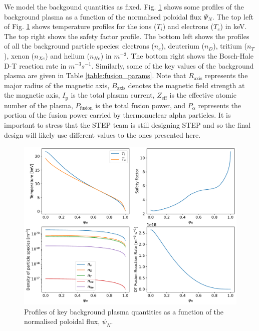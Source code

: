\documentclass[10pt, a4paper, twoside]{article}
\begin{document}
We model the backgound quantities as fixed. Fig. \ref{fig:background_plasma_profiles} shows some profiles of the background plasma as a function of the normalised poloidal flux $\Psi_N$. 
The top left of Fig. \ref{fig:background_plasma_profiles} shows temperature profiles for the ions ($T_i$) and electrons ($T_e$) in keV. 
The top right shows the safety factor profile. 
The bottom left shows the profiles of all the background particle species: electrons ($n_e$), deuterium ($n_D$), tritium ($n_T$), xenon ($n_{Xe}$) and helium ($n_{He}$) in $m^{-3}$. 
The bottom right shows the Bosch-Hale D-T reaction rate \cite{bosch1992} in $m^{-3} s^{-1}$. 
Similarly, some of the key values of the background plasma are given in Table \ref{table:fusion_params}. Note that  $R_{\text{axis}}$ represents the major radius of the magnetic axis, $B_{\text{axis}}$ denotes the magnetic field strength at the magnetic axis, $I_{\text{p}}$ is the total plasma current, $Z_{\text{eff}}$ is the effective atomic number of the plasma, $P_{\text{fusion}}$ is the total fusion power, and $P_{\alpha}$ represents the portion of the fusion power carried by thermonuclear alpha particles. It is important to stress that the STEP team is still designing STEP and so the final design will likely use different values to the ones presented here.

\begin{figure}[!ht]
    \centering
    \includegraphics[width=0.99\linewidth]{Figures/background_plasma_curves.pdf}
    \caption{Profiles of key background plasma quantities as a function of the normalised poloidal flux, $\psi_N$.}
    \label{fig:background_plasma_profiles}
\end{figure}
\end{document}
